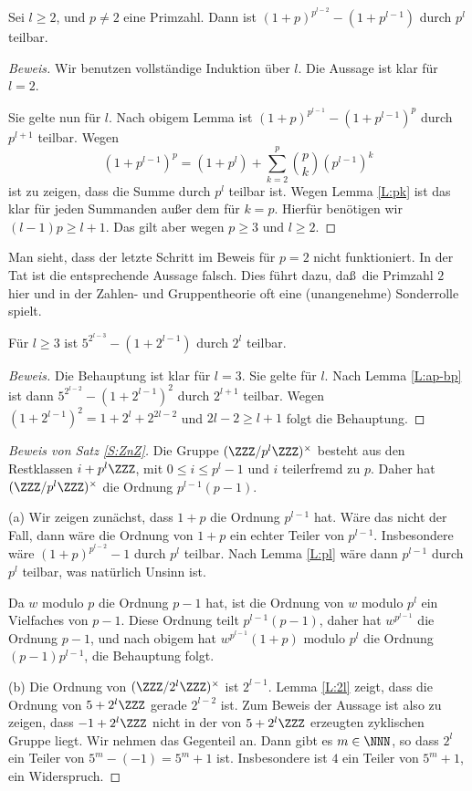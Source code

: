 \documentclass[12pt,a4paper,twoside]{article}
\begin{document}
\begin{Lemma}\label{L:pl}
  Sei $l\ge2$, und $p\ne2$ eine Primzahl. Dann ist
  $(1+p)^{p^{l-2}}-(1+p^{l-1})$ durch $p^l$ teilbar.
\end{Lemma}
\begin{proof}[Beweis]
Wir benutzen vollst\"andige Induktion \"uber $l$. Die Aussage ist klar f\"ur
$l=2$.

Sie gelte nun f\"ur $l$. Nach obigem Lemma ist $(1+p)^{p^{l-1}}-(1+p^{l-1})^p$
durch $p^{l+1}$ teilbar. Wegen
\[
(1+p^{l-1})^p=(1+p^l)+\sum_{k=2}^p\binom{p}{k}(p^{l-1})^k
\]
ist zu zeigen, dass die Summe durch $p^l$ teilbar ist. Wegen Lemma \ref{L:pk}
ist das klar f\"ur jeden Summanden au\ss er dem f\"ur $k=p$. Hierf\"ur
ben\"otigen wir $(l-1)p\ge l+1$. Das gilt aber wegen $p\ge3$ und $l\ge2$.
\end{proof}
\begin{Bemerkung*}
  Man sieht, dass der letzte Schritt im Beweis f\"ur $p=2$ nicht
  funktioniert. In der Tat ist die entsprechende Aussage falsch. Dies f\"uhrt
  dazu, da\ss\ die Primzahl $2$ hier und in der Zahlen- und Gruppentheorie oft
  eine (unangenehme) Sonderrolle spielt.
\end{Bemerkung*}
\begin{Lemma}\label{L:2l}
  F\"ur $l\ge3$ ist $5^{2^{l-3}}-(1+2^{l-1})$ durch $2^l$ teilbar.
\end{Lemma}

\begin{proof}[Beweis]
  Die Behauptung ist klar f\"ur $l=3$. Sie gelte f\"ur $l$. Nach Lemma
  \ref{L:ap-bp} ist dann $5^{2^{l-2}}-(1+2^{l-1})^2$ durch $2^{l+1}$ teilbar.
  Wegen $(1+2^{l-1})^2=1+2^l+2^{2l-2}$ und $2l-2\ge l+1$ folgt die Behauptung.
\end{proof}
\begin{proof}[Beweis von Satz \ref{S:ZnZ}]
  Die Gruppe $(\ZZZ/p^l\ZZZ)^\times$ besteht aus den Restklassen
  $i+p^l\ZZZ$, mit $0\le i\le p^l-1$ und $i$ teilerfremd zu $p$. Daher hat
  $(\ZZZ/p^l\ZZZ)^\times$ die Ordnung $p^{l-1}(p-1)$.
  
  (a) Wir zeigen zun\"achst, dass $1+p$ die Ordnung $p^{l-1}$ hat. W\"are das
  nicht der Fall, dann w\"are die Ordnung von $1+p$ ein echter Teiler von
  $p^{l-1}$. Insbesondere w\"are $(1+p)^{p^{l-2}}-1$ durch $p^l$ teilbar. Nach
  Lemma \ref{L:pl} w\"are dann $p^{l-1}$ durch $p^l$ teilbar, was nat\"urlich
  Unsinn ist.
  
  Da $w$ modulo $p$ die Ordnung $p-1$ hat, ist die Ordnung von $w$ modulo
  $p^l$ ein Vielfaches von $p-1$. Diese Ordnung teilt $p^{l-1}(p-1)$, daher
  hat $w^{p^{l-1}}$ die Ordnung $p-1$, und nach obigem hat $w^{p^{l-1}}(1+p)$
  modulo $p^l$ die Ordnung $(p-1)p^{l-1}$, die Behauptung folgt.
  
  (b) Die Ordnung von $(\ZZZ/2^l\ZZZ)^\times$ ist $2^{l-1}$. Lemma \ref{L:2l}
  zeigt, dass die Ordnung von $5+2^l\ZZZ$ gerade $2^{l-2}$ ist. Zum Beweis der
  Aussage ist also zu zeigen, dass $-1+2^l\ZZZ$ nicht in der von $5+2^l\ZZZ$
  erzeugten zyklischen Gruppe liegt. Wir nehmen das Gegenteil an. Dann gibt es
  $m\in\NNN$, so dass $2^l$ ein Teiler von $5^m-(-1)=5^m+1$ ist. Insbesondere
  ist $4$ ein Teiler von $5^m+1$, ein Widerspruch.
\end{proof}
\end{document}
